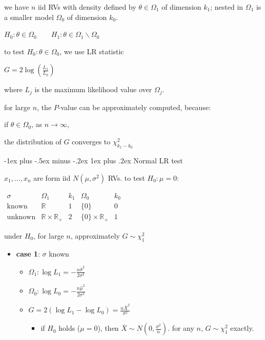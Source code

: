 \documentclass[10pt, landscape]{article}
\makeatletter
\renewcommand{\subsubsection}{\@startsection{subsubsection}{3}{0mm}%
  {-1ex plus -.5ex minus -.2ex}%
  {1ex plus .2ex}%
{\normalfont\small\bfseries}}%
\newcommand{\Xbar}{\bar{X}}
\newcommand{\seq}[2][n]{#2_1, \dots, #2_{#1}}
\makeatother
\begin{document}
\begin{multicols*}{4}
  we have $n$ iid RVs with density defined by $\theta \in \Omega_1$ of dimension $k_1$;
  nested in $\Omega_1$ is a smaller model $\Omega_0$ of dimension $k_0$.

  \begin{tightcenter}
    $H_0 : \theta \in \Omega_0 \qquad H_1 : \theta \in \Omega_1 \backslash \Omega_0$

    to test $H_0 : \theta \in \Omega_0$, we use LR statistic 

    $G = 2\log \left(\frac{L_1}{L_0}\right)$

    where $L_j$ is the maximum likelihood value over $\Omega_j$.
  \end{tightcenter}

  for large $n$, the $P$-value can be approximately computed, because:

  \begin{tightcenter}
    if $\theta \in \Omega_0$, as $n \to \infty$, 

    the distribution of $G$ converges to $\chi^2_{k_1-k_0}$
  \end{tightcenter}

  \subsubsection{Normal LR test}

  $\seq x$ are form iid $N(\mu, \sigma^2)$ RVs.
  to test $H_0 : \mu = 0$:

  $ \begin{array}{c|c|c|c|c}
    \sigma & \Omega_1 & k_1 & \Omega_0 & k_0 \\\hline
    \text{known} & \mathbb{R} & 1 & \{0\} & 0 \\
    \text{unknown} & \mathbb{R}\times \mathbb{R}_+ & 2 & \{0\} \times \mathbb{R}_+ & 1
  \end{array} $

  under $H_0$, for large $n$, approximately $G \sim \chi^2_1$

  \begin{itemize}
    \item \textbf{case 1}: $\sigma$ known
      \begin{itemize}
        \item $\Omega_1 : \log L_1 = -\frac{n\hat\sigma^2}{2\sigma^2}$
        \item $\Omega_0 : \log L_0 = -\frac{n\hat\mu^2}{2\sigma^2}$ 
        \item $G = 2(\log L_1 - \log L_0) = \frac{n\Xbar^2}{\sigma^2}$
          \begin{itemize}
            \item if $H_0$ holds ($\mu = 0$), then $\Xbar \sim N(0, \frac{\sigma^2}{n})$. 
              for any $n$, $G \sim \chi^2_1$ exactly.
          \end{itemize}
      \end{itemize}


\end{itemize}
\end{multicols*}
\end{document}

